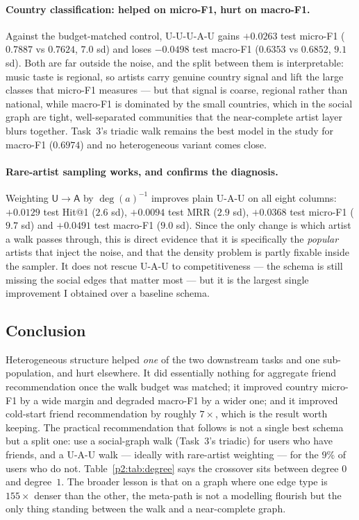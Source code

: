 \paragraph{Country classification: helped on micro-F1, hurt on macro-F1.}
Against the budget-matched control, \textsf{U-U-U-A-U} gains $+0.0263$ test micro-F1
($0.7887$ vs $0.7624$, $7.0$ sd) and loses $-0.0498$ test macro-F1 ($0.6353$ vs $0.6852$,
$9.1$ sd).  Both are far outside the noise, and the split between them is interpretable:
music taste is regional, so artists carry genuine country signal and lift the large
classes that micro-F1 measures --- but that signal is coarse, regional rather than
national, while macro-F1 is dominated by the small countries, which in the social graph
are tight, well-separated communities that the near-complete artist layer blurs together.
Task~3's triadic walk remains the best model in the study for macro-F1 ($0.6974$) and no
heterogeneous variant comes close.

\paragraph{Rare-artist sampling works, and confirms the diagnosis.}
Weighting $\mathsf{U}\to\mathsf{A}$ by $\deg(a)^{-1}$ improves plain \textsf{U-A-U} on all
eight columns: $+0.0129$ test Hit@1 ($2.6$ sd), $+0.0094$ test MRR ($2.9$ sd), $+0.0368$
test micro-F1 ($9.7$ sd) and $+0.0491$ test macro-F1 ($9.0$ sd).  Since the only change is
which artist a walk passes through, this is direct evidence that it is specifically the
\emph{popular} artists that inject the noise, and that the density problem is partly
fixable inside the sampler.  It does not rescue \textsf{U-A-U} to competitiveness --- the
schema is still missing the social edges that matter most --- but it is the largest
single improvement I obtained over a baseline schema.

\subsection{Conclusion}
\label{p2:sec:conclusion}

Heterogeneous structure helped \emph{one} of the two downstream tasks and one
sub-population, and hurt elsewhere.  It did essentially nothing for aggregate friend
recommendation once the walk budget was matched; it improved country micro-F1 by a wide
margin and degraded macro-F1 by a wider one; and it improved cold-start friend
recommendation by roughly $7\times$, which is the result worth keeping.  The practical
recommendation that follows is not a single best schema but a split one: use a
social-graph walk (Task~3's triadic) for users who have friends, and a
\textsf{U-A-U} walk --- ideally with rare-artist weighting --- for the $9\%$ of users who
do not.  Table~\ref{p2:tab:degree} says the crossover sits between degree $0$ and
degree~$1$.  The broader lesson is that on a graph where one edge type is $155\times$
denser than the other, the meta-path is not a modelling flourish but the only thing
standing between the walk and a near-complete graph.
